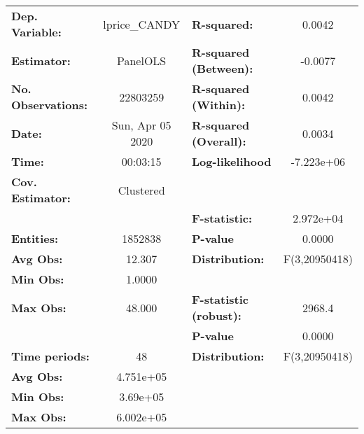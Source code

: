 \documentclass{report}a
\begin{document}
\begin{center}
\begin{tabular}{lclc}
\toprule
\textbf{Dep. Variable:}       &   lprice\_CANDY    & \textbf{  R-squared:         }   &      0.0042      \\
\textbf{Estimator:}           &      PanelOLS      & \textbf{  R-squared (Between):}  &     -0.0077      \\
\textbf{No. Observations:}    &      22803259      & \textbf{  R-squared (Within):}   &      0.0042      \\
\textbf{Date:}                &  Sun, Apr 05 2020  & \textbf{  R-squared (Overall):}  &      0.0034      \\
\textbf{Time:}                &      00:03:15      & \textbf{  Log-likelihood     }   &    -7.223e+06    \\
\textbf{Cov. Estimator:}      &     Clustered      & \textbf{                     }   &                  \\
\textbf{}                     &                    & \textbf{  F-statistic:       }   &    2.972e+04     \\
\textbf{Entities:}            &      1852838       & \textbf{  P-value            }   &      0.0000      \\
\textbf{Avg Obs:}             &       12.307       & \textbf{  Distribution:      }   &  F(3,20950418)   \\
\textbf{Min Obs:}             &       1.0000       & \textbf{                     }   &                  \\
\textbf{Max Obs:}             &       48.000       & \textbf{  F-statistic (robust):} &      2968.4      \\
\textbf{}                     &                    & \textbf{  P-value            }   &      0.0000      \\
\textbf{Time periods:}        &         48         & \textbf{  Distribution:      }   &  F(3,20950418)   \\
\textbf{Avg Obs:}             &     4.751e+05      & \textbf{                     }   &                  \\
\textbf{Min Obs:}             &      3.69e+05      & \textbf{                     }   &                  \\
\textbf{Max Obs:}             &     6.002e+05      & \textbf{                     }   &                  \\
\bottomrule
\end{tabular}
\begin{tabular}{lcccccc}

\end{tabular}
\end{center}
\end{document}
